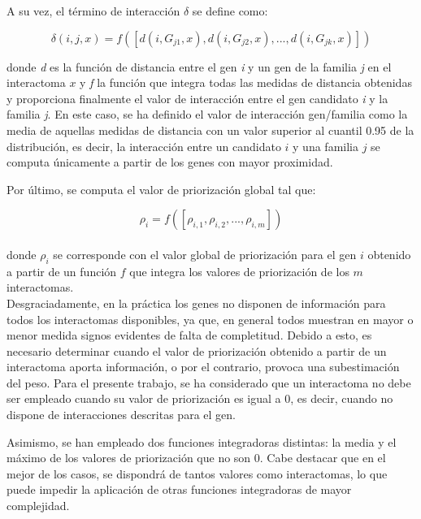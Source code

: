  \medskip
 A su vez, el término de interacción $\delta$ se define como:
 
\begin{equation}
 \delta(i,j,x) = f([d(i, G_{j1},x), d(i,G_{j2},x),...,d(i,G_{jk},x)])
\end{equation}

   
  donde \textit{d} es la función de distancia entre el gen \textit{i} y un gen de la familia \textit{j} en el interactoma $x$ y \textit{f} la función que integra todas las medidas de distancia obtenidas y proporciona finalmente el valor de interacción entre el gen candidato \textit{i} y la familia \textit{j}. En este caso, se ha definido el valor de interacción gen/familia como la media de aquellas medidas de distancia con un valor superior al cuantil 0.95 de la distribución, es decir, la interacción entre un candidato $i$ y una familia $j$ se computa únicamente a partir de los genes con mayor proximidad.

\medskip
Por último, se computa el valor de priorización global tal que:

\begin{equation}
\rho_{i} = f([\rho_{i,1},\rho_{i,2},...,\rho_{i,m}])
\end{equation}
\\

donde $\rho_{i}$ se corresponde con el valor global de priorización para el gen $i$ obtenido a partir de un función $f$ que integra los valores de priorización de los $m$ interactomas.
\\

Desgraciadamente, en la práctica los genes no disponen de información para todos los interactomas disponibles, ya que, en general todos muestran en mayor o menor medida signos evidentes de falta de completitud. Debido a esto, es necesario determinar cuando el valor de priorización obtenido a partir de un interactoma aporta información, o por el contrario, provoca una subestimación del peso. Para el presente trabajo, se ha considerado que un interactoma no debe ser empleado cuando su valor de priorización es igual a 0, es decir, cuando no dispone de interacciones descritas para el gen. 

\medskip
Asimismo, se han empleado dos funciones integradoras distintas: la media y el máximo de los valores de priorización que no son 0. Cabe destacar que en el mejor de los casos, se dispondrá de tantos valores como interactomas, lo que puede impedir la aplicación de otras funciones integradoras de mayor complejidad.

